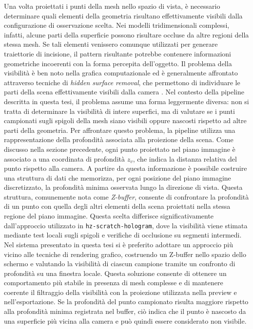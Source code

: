 \documentclass[a4paper,11pt,titlepage,twoside]{book}
\newcommand{\1}{\mathbf{1}}
\numberwithin{equation}{chapter}
\theoremstyle{plain}
\theoremstyle{definition}
\begin{document}
	Una volta proiettati i punti della mesh nello spazio di vista, è necessario determinare quali elementi della geometria risultano effettivamente visibili dalla configurazione di osservazione scelta. Nei modelli tridimensionali complessi, infatti, alcune parti della superficie possono risultare occluse da altre regioni della stessa mesh. Se tali elementi venissero comunque utilizzati per generare traiettorie di incisione, il pattern risultante potrebbe contenere informazioni geometriche incoerenti con la forma percepita dell’oggetto.
	Il problema della visibilità è ben noto nella grafica computazionale ed è generalmente affrontato attraverso tecniche di \emph{hidden surface removal}\cite{Foley1996}, che permettono di individuare le parti della scena effettivamente visibili dalla camera \cite{Foley1996}. Nel contesto della pipeline descritta in questa tesi, il problema assume una forma leggermente diversa: non si tratta di determinare la visibilità di intere superfici, ma di valutare se i punti campionati sugli spigoli della mesh siano visibili oppure nascosti rispetto ad altre parti della geometria.
	Per affrontare questo problema, la pipeline utilizza una rappresentazione della profondità associata alla proiezione della scena. Come discusso nella sezione precedente, ogni punto proiettato nel piano immagine è associato a una coordinata di profondità \(z_v\), che indica la distanza relativa del punto rispetto alla camera. A partire da questa informazione è possibile costruire una struttura di dati che memorizza, per ogni posizione del piano immagine discretizzato, la profondità minima osservata lungo la direzione di vista.
	Questa struttura, comunemente nota come \emph{Z-buffer}, consente di confrontare la profondità di un punto con quella degli altri elementi della scena proiettati nella stessa regione del piano immagine. 
	Questa scelta differisce significativamente dall’approccio utilizzato in \texttt{hz-scratch-hologram}, dove la visibilità viene stimata mediante test locali sugli spigoli e verifiche di occlusione su segmenti intermedi. Nel sistema presentato in questa tesi si è preferito adottare un approccio più vicino alle tecniche di rendering grafico, costruendo un Z-buffer nello spazio dello schermo e valutando la visibilità di ciascun campione tramite un confronto di profondità su una finestra locale. Questa soluzione consente di ottenere un comportamento più stabile in presenza di mesh complesse e di mantenere coerente il filtraggio della visibilità con la proiezione utilizzata nella preview e nell’esportazione.
	Se la profondità del punto campionato risulta maggiore rispetto alla profondità minima registrata nel buffer, ciò indica che il punto è nascosto da una superficie più vicina alla camera e può quindi essere considerato non visibile.
\end{document}
